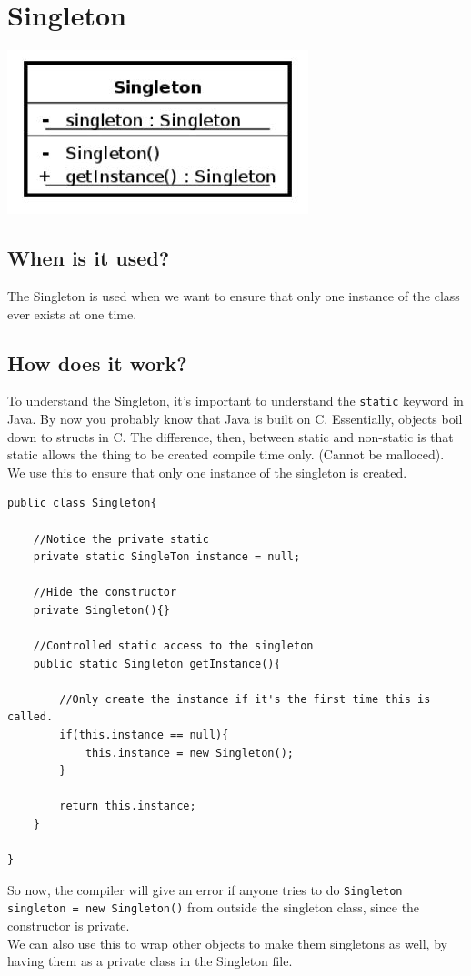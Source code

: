 \documentclass[12pt]{article}
\theoremstyle{definition}
\begin{document}
\section{Singleton}
\includegraphics{singleton}
\subsection{When is it used?}
The Singleton is used when we want to ensure that only one instance of the class ever exists at one time.
\subsection{How does it work?}
To understand the Singleton, it's important to understand the \texttt{static} keyword in Java. By now you probably know that Java is built on C. Essentially, objects boil down to structs in C. The difference, then, between static and non-static is that static allows the thing to be created compile time only. (Cannot be malloced).
\\ \linebreak
We use this to ensure that only one instance of the singleton is created. 

\begin{lstlisting}
public class Singleton{

	//Notice the private static 
	private static SingleTon instance = null;
	
	//Hide the constructor
	private Singleton(){}
	
	//Controlled static access to the singleton
	public static Singleton getInstance(){

		//Only create the instance if it's the first time this is called.
		if(this.instance == null){
			this.instance = new Singleton();
		}
	
		return this.instance;
	}
	
}
\end{lstlisting}
So now, the compiler will give an error if anyone tries to do \texttt{Singleton singleton = new Singleton()} from outside the singleton class, since the constructor is private. 
\\ \linebreak
We can also use this to wrap other objects to make them singletons as well, by having them as a private class in the Singleton file. 
\end{document}
